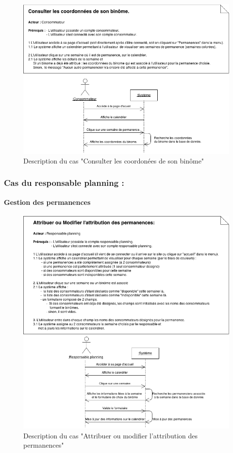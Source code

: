 \documentclass[12pt]{report}
\begin{document}
\begin{figure}[!h]
\centering
\includegraphics[width=1.\textwidth]{./ressources/desc_UC_coo_binome.png}
\caption{Description du cas "Consulter les coordonées de son binôme"}
\end{figure}
\clearpage

\subsubsection{Cas du responsable planning :}
\paragraph*{Gestion des permanences}
\begin{figure}[!h]
\centering
\includegraphics[width=1.\textwidth]{./ressources/desc_UC_attribuer_permanences.png}
\caption{Description du cas "Attribuer ou modifier l'attribution des permanences"}
\end{figure}
\clearpage
\end{document}
